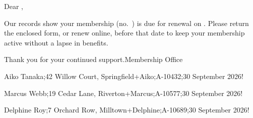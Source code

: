 \documentclass{article}
\begin{document}
\beginletter
\NOPAGENUMBERS\parindent=0pt
\noindent{\it\paras[1]}\par
\blockparas[2]\par\bigskip

Dear \paras[1][2],\par\medskip
Our records show your membership (no.\ \paras[2][2]) is due for
renewal on \paras[3][2]. Please return the enclosed form, or renew
online, before that date to keep your membership active without a
lapse in benefits.\par\medskip
Thank you for your continued support.\hfill Membership
Office\vfill\eject
\endletter

\moreletter
  Aiko Tanaka;42 Willow Court, Springfield+Aiko;A-10432;30 September 2026!

\moreletter
  Marcus Webb;19 Cedar Lane, Riverton+Marcus;A-10577;30 September 2026!

\moreletter
  Delphine Roy;7 Orchard Row, Milltown+Delphine;A-10689;30 September 2026!
\end{document}
